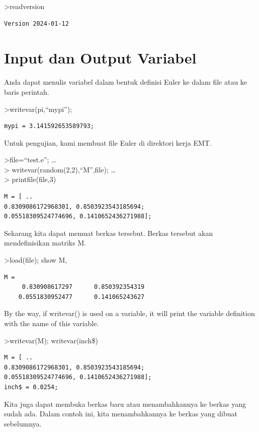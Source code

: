 \documentclass[
]{book}
\begin{document}
\textgreater readversion

\begin{verbatim}
Version 2024-01-12
\end{verbatim}

\section{Input dan Output Variabel}\label{input-dan-output-variabel}

Anda dapat menulis variabel dalam bentuk definisi Euler ke dalam file atau ke baris perintah.

\textgreater writevar(pi,``mypi'');

\begin{verbatim}
mypi = 3.141592653589793;
\end{verbatim}

Untuk pengujian, kami membuat file Euler di direktori kerja EMT.

\textgreater file=``test.e''; \ldots{}\\
\textgreater{} writevar(random(2,2),``M'',file); \ldots{}\\
\textgreater{} printfile(file,3)

\begin{verbatim}
M = [ ..
0.8309086172968301, 0.8503923543185694;
0.05518309524774696, 0.1410652436271988];
\end{verbatim}

Sekarang kita dapat memuat berkas tersebut. Berkas tersebut akan mendefinisikan matriks M.

\textgreater load(file); show M,

\begin{verbatim}
M = 
     0.830908617297      0.850392354319 
    0.0551830952477      0.141065243627 
\end{verbatim}

By the way, if writevar() is used on a variable, it will print the variable definition with the name of this variable.

\textgreater writevar(M); writevar(inch\$)

\begin{verbatim}
M = [ ..
0.8309086172968301, 0.8503923543185694;
0.05518309524774696, 0.1410652436271988];
inch$ = 0.0254;
\end{verbatim}

Kita juga dapat membuka berkas baru atau menambahkannya ke berkas yang sudah ada. Dalam contoh ini, kita menambahkannya ke berkas yang dibuat sebelumnya.
\end{document}
